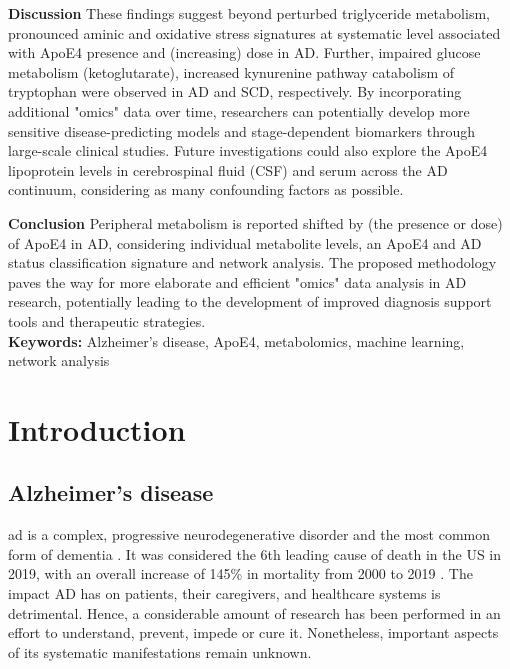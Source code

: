 \documentclass{amsart}
\newcommand{\mainmatter}{
    \newpage
    \pagenumbering{arabic}  %
}
\begin{document}
\textbf{Discussion}\hspace{.1cm} These findings suggest beyond perturbed triglyceride metabolism, pronounced aminic and oxidative stress signatures at systematic level associated with ApoE4 presence and (increasing) dose in AD. Further, impaired glucose metabolism (ketoglutarate), increased kynurenine pathway catabolism of tryptophan were observed in AD and SCD, respectively. By incorporating additional "omics" data over time, researchers can potentially develop more sensitive disease-predicting models and stage-dependent biomarkers through large-scale clinical studies. Future investigations could also explore the ApoE4 lipoprotein levels in cerebrospinal fluid (CSF) and serum across the AD continuum, considering as many confounding factors as possible.

\textbf{Conclusion}\hspace{.1cm} Peripheral metabolism is reported shifted by (the presence or dose) of ApoE4 in AD, considering individual metabolite levels, an ApoE4 and AD status classification signature and network analysis. The proposed methodology paves the way for more elaborate and efficient "omics" data analysis in AD research, potentially leading to the development of improved diagnosis support tools and therapeutic strategies.\\

\textbf{Keywords:}\hspace{.1cm} Alzheimer's disease, ApoE4, metabolomics, machine learning, network analysis 

\restoregeometry
\clearpage
\printacronyms[title = Abbreviations, toctitle = ABBREVIATIONS]

\newpage
\tableofcontents

\mainmatter

\newpage
\section{Introduction}\label{Intro}
\subsection{Alzheimer’s disease}
\acrfull{ad} is a complex, progressive neurodegenerative disorder and the most common form of dementia \cite{Penke2023NewDisease}. It was considered the 6th leading cause of death in the US in 2019, with an overall increase of 145\% in mortality from 2000 to 2019 \cite{20232023Figures}. The impact AD has on patients, their caregivers, and healthcare systems is detrimental. Hence, a considerable amount of research has been performed in an effort to understand, prevent, impede or cure it. Nonetheless, important aspects of its systematic manifestations remain unknown.
\end{document}

